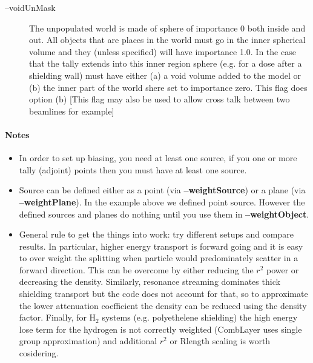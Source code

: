 \begin{description}
\begin{description}
  \end{description}

\item[--voidUnMask] The unpopulated world is made of sphere of importance 0 both inside and out.
  All objects that are places in the world must go in the inner spherical volume and they (unless specified) will have
  importance 1.0. In the case that the tally extends into this inner region sphere (e.g. for a dose after a
  shielding wall) must have either (a) a void volume added to the model or (b) the inner part of the world shere set
  to importance zero. This flag does option (b) [This flag may also be used to allow cross talk between two beamlines for
    example] 

\end{description}

\paragraph{Notes}
\begin{itemize}
\item In order to set up biasing, you need at least one source, if you one or more tally (adjoint) points then you must have at least one source.

\item Source can be defined either as a point (via {\bf --weightSource}) or a plane (via {\bf --weightPlane}).
  In the example above we defined point source. However the defined sources and planes do nothing until you use them in
  {\bf --weightObject}.
  
\item General rule to get the things into work: try different setups and compare results. In particular, higher energy
  transport is forward going and it is easy to over weight the splitting when particle would predominately scatter
  in a forward direction. This can be overcome by either reducing the $r^2$ power or decreasing the density.
  Similarly, resonance streaming dominates thick shielding transport but the code does not account for that, so to
  approximate the lower attenuation coefficient the density can be reduced using the density factor. Finally,
  for H$_2$ systems (e.g. polyethelene shielding) the high energy lose term for the hydrogen is not correctly
  weighted (CombLayer uses single group approximation) and additional $r^2$ or Rlength scaling is worth cosidering.

\end{itemize}


